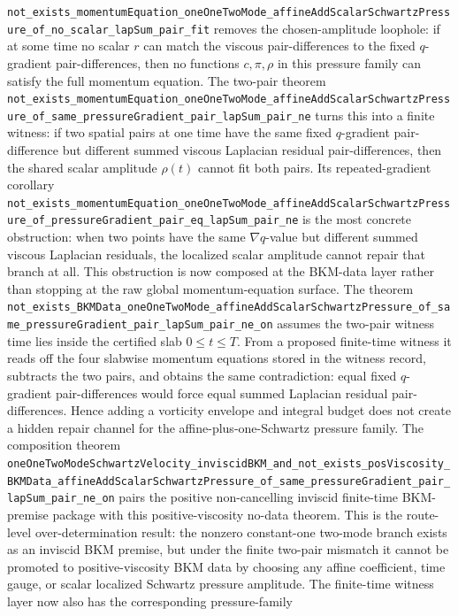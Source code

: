 \documentclass[11pt]{article}
\begin{document}
\texttt{not\_exists\_momentumEquation\_oneOneTwoMode\_affineAddScalarSchwartzPressure\_of\_no\_scalar\_lapSum\_pair\_fit}
removes the chosen-amplitude loophole: if at some time no scalar \(r\) can
match the viscous pair-differences to the fixed \(q\)-gradient
pair-differences, then no functions \(c,\pi,\rho\) in this pressure family can
satisfy the full momentum equation.  The two-pair theorem
\texttt{not\_exists\_momentumEquation\_oneOneTwoMode\_affineAddScalarSchwartzPressure\_of\_same\_pressureGradient\_pair\_lapSum\_pair\_ne}
turns this into a finite witness: if two spatial pairs at one time have the
same fixed \(q\)-gradient pair-difference but different summed viscous
Laplacian residual pair-differences, then the shared scalar amplitude
\(\rho(t)\) cannot fit both pairs.  Its repeated-gradient corollary
\texttt{not\_exists\_momentumEquation\_oneOneTwoMode\_affineAddScalarSchwartzPressure\_of\_pressureGradient\_pair\_eq\_lapSum\_pair\_ne}
is the most concrete obstruction: when two points have the same
\(\nabla q\)-value but different summed viscous Laplacian residuals, the
localized scalar amplitude cannot repair that branch at all.
This obstruction is now composed at the BKM-data layer rather than stopping at
the raw global momentum-equation surface.  The theorem
\texttt{not\_exists\_BKMData\_oneOneTwoMode\_affineAddScalarSchwartzPressure\_of\_same\_pressureGradient\_pair\_lapSum\_pair\_ne\_on}
assumes the two-pair witness time lies inside the certified slab
\(0\le t\le T\).  From a proposed finite-time witness it reads off the four
slabwise momentum equations stored in the witness record, subtracts the two
pairs, and obtains the same contradiction: equal fixed \(q\)-gradient
pair-differences would force equal summed Laplacian residual
pair-differences.  Hence adding a vorticity envelope and integral budget does
not create a hidden repair channel for the affine-plus-one-Schwartz pressure
family.
The composition theorem
\texttt{oneOneTwoModeSchwartzVelocity\_inviscidBKM\_and\_not\_exists\_posViscosity\_BKMData\_affineAddScalarSchwartzPressure\_of\_same\_pressureGradient\_pair\_lapSum\_pair\_ne\_on}
pairs the positive non-cancelling inviscid finite-time BKM-premise package with
this positive-viscosity no-data theorem.  This is the route-level
over-determination result: the nonzero constant-one two-mode branch exists as
an inviscid BKM premise, but under the finite two-pair mismatch it cannot be
promoted to positive-viscosity BKM data by choosing any affine coefficient,
time gauge, or scalar localized Schwartz pressure amplitude.
The finite-time witness layer now also has the corresponding pressure-family
\end{document}
